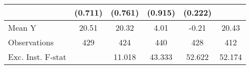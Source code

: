 {\begin{tabular}{l*{5}{c}}
            &     (0.711)         &     (0.761)         &     (0.915)         &     (0.222)         &                     \\
\midrule
Mean Y      &       20.51         &       20.32         &        4.01         &       -0.21         &       20.43         \\
Observations&         429         &         424         &         440         &         428         &         412         \\
Exc. Inst. F-stat&                     &      11.018         &      43.333         &      52.622         &      52.174         \\
\bottomrule
\end{tabular}
}
